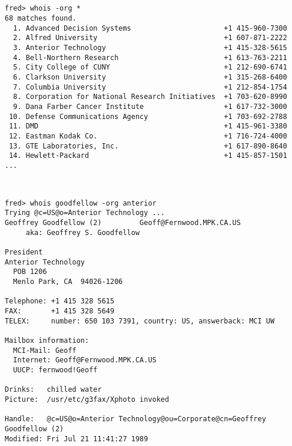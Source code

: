 \begin{bwslide}

\smaller
\begin{verbatim}


fred> whois -org *
68 matches found.
  1. Advanced Decision Systems                      +1 415-960-7300
  2. Alfred University                              +1 607-871-2222
  3. Anterior Technology                            +1 415-328-5615
  4. Bell-Northern Research                         +1 613-763-2211
  5. City College of CUNY                           +1 212-690-6741
  6. Clarkson University                            +1 315-268-6400
  7. Columbia University                            +1 212-854-1754
  8. Corporation for National Research Initiatives  +1 703-620-8990
  9. Dana Farber Cancer Institute                   +1 617-732-3000
 10. Defense Communications Agency                  +1 703-692-2788
 11. DMD                                            +1 415-961-3380
 12. Eastman Kodak Co.                              +1 716-724-4000
 13. GTE Laboratories, Inc.                         +1 617-890-8640
 14. Hewlett-Packard                                +1 415-857-1501
...
\end{verbatim}
\end{bwslide}


\begin{bwslide}

\smaller
\begin{verbatim}


fred> whois goodfellow -org anterior
Trying @c=US@o=Anterior Technology ...
Geoffrey Goodfellow (2)         Geoff@Fernwood.MPK.CA.US
     aka: Geoffrey S. Goodfellow

President
Anterior Technology
  POB 1206
  Menlo Park, CA  94026-1206

Telephone: +1 415 328 5615
FAX:       +1 415 328 5649
TELEX:     number: 650 103 7391, country: US, answerback: MCI UW

Mailbox information:
  MCI-Mail: Geoff
  Internet: Geoff@Fernwood.MPK.CA.US
  UUCP: fernwood!Geoff

Drinks:   chilled water
Picture:  /usr/etc/g3fax/Xphoto invoked

Handle:   @c=US@o=Anterior Technology@ou=Corporate@cn=Geoffrey Goodfellow (2)
Modified: Fri Jul 21 11:41:27 1989
\end{verbatim}
\end{bwslide}


